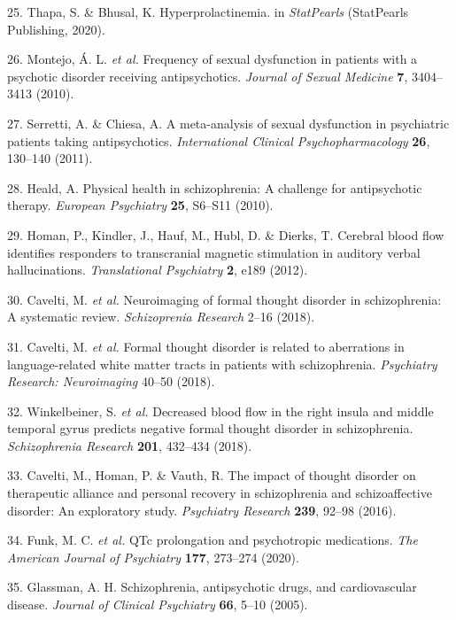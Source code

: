 \documentclass[9pt,english,,jou,floatsintext]{apa6}
\begin{document}
\hypertarget{ref-Thapa2020}{}
25. Thapa, S. \& Bhusal, K. Hyperprolactinemia. in \emph{StatPearls}
(StatPearls Publishing, 2020).

\hypertarget{ref-Montejo2010}{}
26. Montejo, Á. L. \emph{et al.} Frequency of sexual dysfunction in
patients with a psychotic disorder receiving antipsychotics.
\emph{Journal of Sexual Medicine} \textbf{7}, 3404--3413 (2010).

\hypertarget{ref-Serretti2011}{}
27. Serretti, A. \& Chiesa, A. A meta-analysis of sexual dysfunction in
psychiatric patients taking antipsychotics. \emph{International Clinical
Psychopharmacology} \textbf{26}, 130--140 (2011).

\hypertarget{ref-Heald2010}{}
28. Heald, A. Physical health in schizophrenia: A challenge for
antipsychotic therapy. \emph{European Psychiatry} \textbf{25}, S6--S11
(2010).

\hypertarget{ref-Homan2012a}{}
29. Homan, P., Kindler, J., Hauf, M., Hubl, D. \& Dierks, T. Cerebral
blood flow identifies responders to transcranial magnetic stimulation in
auditory verbal hallucinations. \emph{Translational Psychiatry}
\textbf{2}, e189 (2012).

\hypertarget{ref-Cavelti2018}{}
30. Cavelti, M. \emph{et al.} Neuroimaging of formal thought disorder in
schizophrenia: A systematic review. \emph{Schizoprenia Research} 2--16
(2018).

\hypertarget{ref-Cavelti2018a}{}
31. Cavelti, M. \emph{et al.} Formal thought disorder is related to
aberrations in language-related white matter tracts in patients with
schizophrenia. \emph{Psychiatry Research: Neuroimaging} 40--50 (2018).

\hypertarget{ref-Winkelbeiner2018a}{}
32. Winkelbeiner, S. \emph{et al.} Decreased blood flow in the right
insula and middle temporal gyrus predicts negative formal thought
disorder in schizophrenia. \emph{Schizophrenia Research} \textbf{201},
432--434 (2018).

\hypertarget{ref-Cavelti2016}{}
33. Cavelti, M., Homan, P. \& Vauth, R. The impact of thought disorder
on therapeutic alliance and personal recovery in schizophrenia and
schizoaffective disorder: An exploratory study. \emph{Psychiatry
Research} \textbf{239}, 92--98 (2016).

\hypertarget{ref-Funk2020}{}
34. Funk, M. C. \emph{et al.} QTc prolongation and psychotropic
medications. \emph{The American Journal of Psychiatry} \textbf{177},
273--274 (2020).

\hypertarget{ref-Glassman2005}{}
35. Glassman, A. H. Schizophrenia, antipsychotic drugs, and
cardiovascular disease. \emph{Journal of Clinical Psychiatry}
\textbf{66}, 5--10 (2005).
\end{document}
